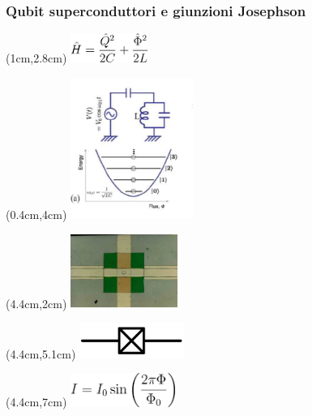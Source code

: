 \documentclass[10pt]{beamer}
\begin{document}
\begin{frame}
\frametitle{Qubit superconduttori e giunzioni Josephson}


\begin{textblock*}{4cm}(1cm,2.8cm) %
\includegraphics[width=2.5cm]{img3/HLC_new.png}
\end{textblock*}

\begin{textblock*}{4cm}(0.4cm,4cm) %
\includegraphics[width=4cm]{img3/LC_microwave.png}
\end{textblock*}

\begin{textblock*}{3.5cm}(4.4cm,2cm) %
\includegraphics[width=3.5cm]{img3/Josephson_junction_real.jpg}
\end{textblock*}

\begin{textblock*}{3.5cm}(4.4cm,5.1cm) %
\includegraphics[width=3.4cm]{img3/JJ_simbolo.JPG}
\end{textblock*}


\begin{textblock*}{3.5cm}(4.4cm,7cm) %
\includegraphics[width=3.4cm]{img3/IJJ_new.png}
\end{textblock*}


\end{frame}
\end{document}
